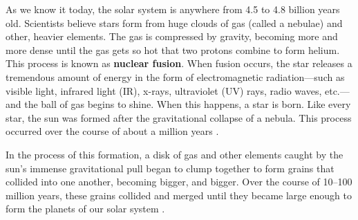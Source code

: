     As we know it today, the solar system is anywhere from 4.5 to 4.8 billion years old. Scientists believe stars form from huge clouds of gas (called a \gls{nebulae}) and other, heavier elements. The gas is compressed by gravity, becoming more and more dense until the gas gets so hot that two protons combine to form helium. %
    This process is known as \textbf{nuclear fusion}. When fusion occurs, the star releases a tremendous amount of energy in the form of electromagnetic radiation---such as visible light, infrared light (IR), x-rays, ultraviolet (UV) rays, radio waves, etc.---and the ball of gas begins to shine. When this happens, a star is born. Like every star, the sun was formed after the gravitational collapse of a nebula. This process occurred over the course of about a million years \citep{formation_solar}.

    In the process of this formation, a disk of gas and other elements caught by the sun's immense gravitational pull began to clump together to form grains that collided into one another, becoming bigger, and bigger. Over the course of 10--100 million years, these grains collided and merged until they became large enough to form the planets of our solar system \citep{hayashi1985formation}.

